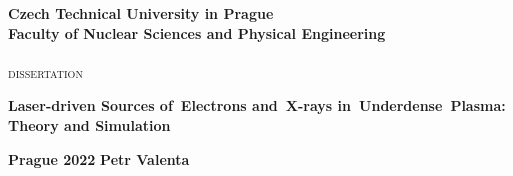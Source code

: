 \documentclass[10pt, a4paper, twoside, openright]{report}
\newcommand{\ctu}{Czech Technical University in Prague}
\newcommand{\fnspe}{Faculty of Nuclear Sciences and Physical Engineering}
\newcommand{\projecttitle}{Laser-driven Sources of~Electrons and~X-rays in~Underdense Plasma: Theory and Simulation}
\begin{document}


\begin{titlepage}









\begin{center}
\begin{spacing}{2.2}
{\Large \bf \ctu} \\
{\Large \bf \fnspe} \\[16mm]
\epsfysize=40mm \\[16mm]
{\huge \textsc{dissertation}}\\[16mm]
\parbox{12cm}
{
\centering
{\LARGE \bf Laser-driven Sources of~Electrons and~X-rays in~Underdense~Plasma: Theory and Simulation}
}
\end{spacing}
\end{center}



\vfill
{\Large \bf Prague 2022} \hfill {\Large \bf Petr Valenta}

\end{titlepage}
\end{document}
